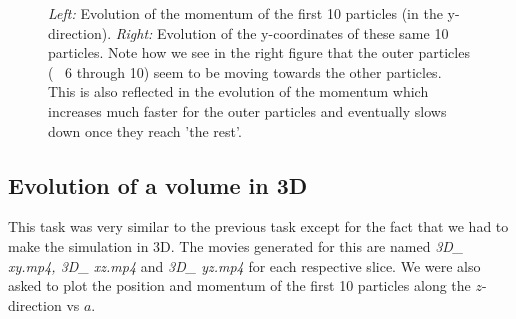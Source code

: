 \documentclass[a4paper,10pt]{article}
\begin{document}
\begin{figure}[h!] 
	\begin{center}
	\end{center}
	\captionsetup{width=0.8\linewidth}
	\vspace*{-7mm} %
	\caption{\textit{Left:} Evolution of the momentum of the first 10 particles (in the y-direction).  \textit{Right:} Evolution of the y-coordinates of these same 10 particles. Note how we see in the right figure that the outer particles (~ 6 through 10) seem to be moving towards the other particles. This is also reflected in the evolution of the momentum which increases much faster for the outer particles and eventually slows down once they reach 'the rest'.}
	\label{fig:4ab}
\end{figure}

\subsection{Evolution of a volume in 3D}

This task was very similar to the previous task except for the fact that we had to make the simulation in 3D. The movies generated for this are named \textit{3D\_ xy.mp4, 3D\_ xz.mp4} and \textit{3D\_ yz.mp4} for each respective slice. We were also asked to plot the position and momentum of the first 10 particles along the $z$-direction vs $a$. 
\end{document}
